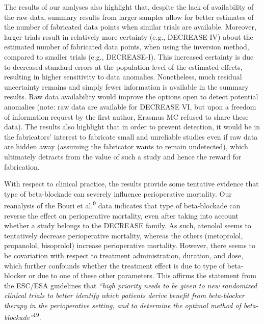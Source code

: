 \documentclass[]{article}
\begin{document}
The results of our analyses also highlight that, despite the lack of
availability of the raw data, summary results from larger samples allow
for better estimates of the number of fabricated data points when
similar trials are available. Moreover, larger trials result in
relatively more certainty (e.g., DECREASE-IV) about the estimated number
of fabricated data points, when using the inversion method, compared to
smaller trials (e.g., DECREASE-I). This increased certainty is due to
decreased standard errors at the population level of the estimated
effects, resulting in higher sensitivity to data anomalies. Nonetheless,
much residual uncertainty remains and simply fewer information is
available in the summary results. Raw data availability would improve
the options open to detect potential anomalies (note: raw data are
available for DECREASE VI, but upon a freedom of information request by
the first author, Erasmus MC refused to share these data). The results
also highlight that in order to prevent detection, it would be in the
fabricators' interest to fabricate small and unreliable studies even if
raw data are hidden away (assuming the fabricator wants to remain
undetected), which ultimately detracts from the value of such a study
and hence the reward for fabrication.

With respect to clinical practice, the results provide some tentative
evidence that type of beta-blockade can severely influence perioperative
mortality. Our reanalysis of the Bouri et al.\textsuperscript{9} data
indicates that type of beta-blockade can reverse the effect on
perioperative mortality, even after taking into account whether a study
belongs to the DECREASE family. As such, atenolol seems to tentatively
decrease perioperative mortality, whereas the others (metoprolol,
propanolol, bisoprolol) increase perioperative mortality. However, there
seems to be covariation with respect to treatment administration,
duration, and dose, which further confounds whether the treatment effect
is due to type of beta-blocker or due to one of these other parameters.
This affirms the statement from the ESC/ESA guidelines that \emph{``high
priority needs to be given to new randomized clinical trials to better
identify which patients derive benefit from beta-blocker therapy in the
perioperative setting, and to determine the optimal method of
beta-blockade''}\textsuperscript{19}.
\end{document}
